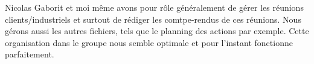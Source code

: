 		
		Nicolas Gaborit et moi même avons pour rôle généralement de gérer les réunions clients/industriels et surtout de rédiger 
	les comtpe-rendus de ces réunions. Nous gérons aussi les autres fichiers, tels que le planning des actions par exemple. Cette organisation dans le groupe nous semble optimale et pour l'instant fonctionne
	parfaitement. 